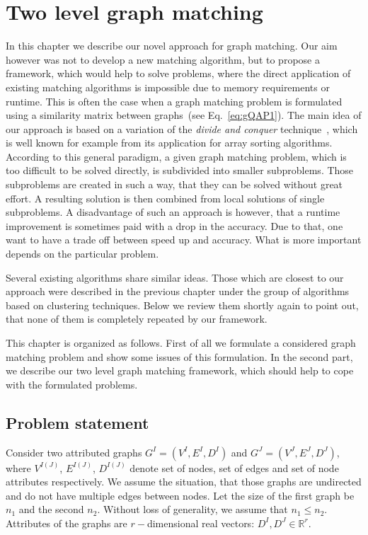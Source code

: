 \chapter{Two level graph matching} \label{chapter:2levelGM}
In this chapter we describe our novel approach for graph matching. Our aim however was not to develop a new matching algorithm, but to propose a framework, which would help to solve problems, where the direct application of existing matching algorithms is impossible due to memory requirements or runtime. This is often the case when a graph matching problem is formulated using a similarity matrix between graphs~(see Eq.~\eqref{eq:gQAP1}). The main idea of our approach is based on a variation of the \emph{divide and conquer} technique~\cite{Cormen}, which is well known for example from its application for array sorting algorithms. According to this general paradigm, a given graph matching problem, which is too difficult to be solved directly, is subdivided into smaller subproblems. Those subproblems are created in such a way, that they can be solved without great effort. A resulting solution is then combined from local solutions of single subproblems. A disadvantage of such an approach is however, that a runtime improvement is sometimes paid with a drop in the accuracy.
Due to that, one want to have a trade off between speed up and accuracy. What is more important depends on the particular problem.

Several existing algorithms share similar ideas. Those which are closest to our approach were described in the previous chapter under the group of algorithms based on clustering techniques. Below we review them shortly again to point out, that none of them is completely repeated by our framework.

This chapter is organized as follows. First of all we formulate a considered graph matching problem and show some issues of this formulation. In the second part, we describe our two level graph matching framework, which should help to cope with the formulated problems. %
\section{Problem statement} \label{sec:prob_stat}
Consider two attributed graphs $G^I = (V^I, E^I, D^I)$ and $G^J = (V^J, E^J, D^J)$, where $V^{I(J)}$, $E^{I(J)}$, $D^{I(J)}$ denote set of nodes, set of edges and set of node attributes respectively. We assume the situation, that those graphs are undirected and do not have multiple edges between nodes. Let the size of the first graph be $n_1$ and the second $n_2$. Without loss of generality, we assume that $n_1\le n_2$. Attributes of the graphs are $r-$dimensional real vectors: $D^I,D^J\in\mathbb{R}^r$.

